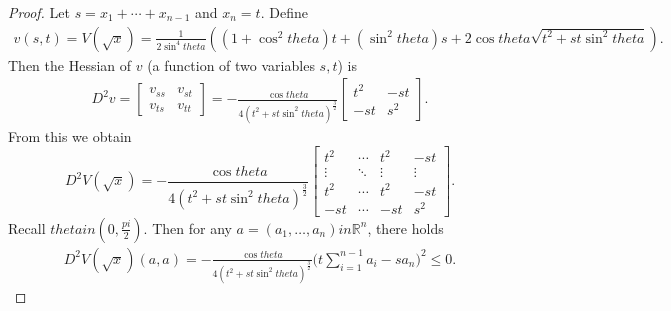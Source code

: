 \documentclass[10pt,a4paper]{amsart}
\newcommand{\eq}[1]{\begin{equation}\begin{alignedat}{2} #1 \end{alignedat}\end{equation}}
\def\in{in }%
\def\pi{pi}%
\def\theta{theta}%
\begin{document}
\begin{proof}
Let $s=x_1+\cdots+x_{n-1}$ and $x_n=t$. Define
\eq{
v(s,t)=V(\sqrt{x})=\frac{1}{2\sin^4\theta}\left((1+\cos^2\theta)t+(\sin^2\theta)s +2\cos\theta \sqrt{t^2+s t\sin^2\theta}\right).
}
Then the Hessian of $v$ (a function of two variables $s,t$) is
\eq{
D^2v=\begin{bmatrix}
v_{ss} & v_{st}\\
v_{ts} & v_{tt}
\end{bmatrix}=-\frac{\cos\theta}{4(t^2+s t\sin^2\theta)^\frac{3}{2}}\begin{bmatrix}
    t^2 & -st \\
    -st & s^2
\end{bmatrix}.
}
From this we obtain
\begin{equation}
D^2V(\sqrt{x}) = -\frac{\cos\theta}{4(t^2+s t\sin^2\theta)^\frac{3}{2}}
\begin{bmatrix}
t^2 & \cdots & t^2 & -st \\
\vdots & \ddots & \vdots & \vdots \\
t^2 & \cdots & t^2 & -st \\
-st& \cdots & -st & s^2
\end{bmatrix}.
\end{equation}
Recall $\theta\in (0,\frac{\pi}{2})$. Then for any $a=(a_1,\ldots, a_n)\in \mathbb{R}^n$, there holds
\eq{
D^2V(\sqrt{x})(a,a)=-\frac{\cos\theta}{4(t^2+s t\sin^2\theta)^{\frac{3}{2}}}\big(t\sum_{i=1}^{n-1}a_i-sa_n\big)^2 \leq 0.
}
\end{proof}
\end{document}
